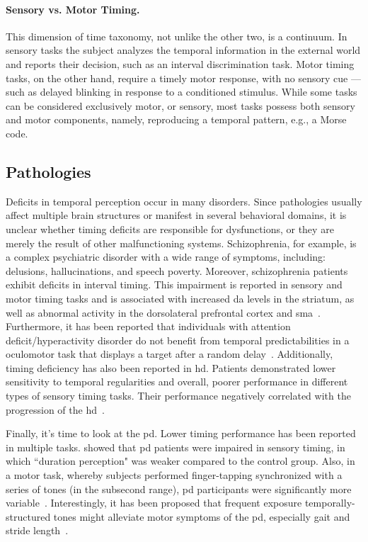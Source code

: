 \paragraph{Sensory vs. Motor Timing.} \label{ch:intro:taxonomy:SENvsMOT}
This dimension of time taxonomy, not unlike the other two, is a continuum.
In sensory tasks the subject analyzes the temporal information in the external world and reports their decision, such as an interval discrimination task.
Motor timing tasks, on the other hand, require a timely motor response, with no sensory cue --- such as delayed blinking in response to a conditioned stimulus.
While some tasks can be considered exclusively motor, or sensory, most tasks possess both sensory and motor components, namely, reproducing a temporal pattern, e.g., a Morse code.

\subsection{Pathologies}
\label{ch:intro:Time:pathologies}
Deficits in temporal perception occur in many disorders.
Since pathologies usually affect multiple brain structures or manifest in several behavioral domains, it is unclear whether timing deficits are responsible for dysfunctions, or they are merely the result of other malfunctioning systems.
Schizophrenia, for example, is a complex psychiatric disorder with a wide range of symptoms, including: delusions, hallucinations, and speech poverty.
Moreover, schizophrenia patients exhibit deficits in interval timing.
This impairment is reported in sensory and motor timing tasks and is associated with increased \gls{da} levels in the striatum, as well as abnormal activity in the dorsolateral prefrontal cortex and \gls{sma}~\cite[see][]{Snowden2019}.
Furthermore, it has been reported that individuals with attention deficit/hyperactivity disorder do not benefit from temporal predictabilities in a oculomotor task that displays a target after a random delay~\cite{Dankner2017}.
Additionally, timing deficiency has also been reported in \gls{hd}.
Patients demonstrated lower sensitivity to temporal regularities and overall, poorer performance in different types of sensory timing tasks.
Their performance negatively correlated with the progression of the \gls{hd}~\cite{Cope2014}.
\par
Finally, it's time to look at the \gls{pd}.\footnotemark
{}
Lower timing performance has been reported in multiple tasks.
 showed that \gls{pd} patients were impaired in sensory timing, in which ``duration perception" was weaker compared to the control group.
Also, in a motor task, whereby subjects performed finger-tapping synchronized with a series of tones (in the subsecond range), \gls{pd} participants were significantly more variable~\cite{Harrington1998}.
Interestingly, it has been proposed that frequent exposure temporally-structured tones might alleviate motor symptoms of the \gls{pd}, especially gait and stride length~\cite{Dalla2017}.